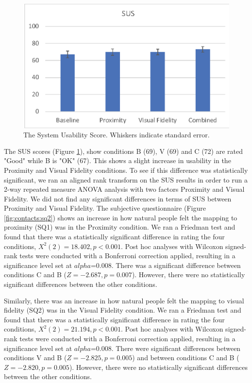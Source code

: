 \begin{figure}[ht]
    \centering
    \includegraphics[width=.8\linewidth]{images/mgia17/analysis-images-02.eps}
    \caption{The System Usability Score. Whiskers indicate standard error.}
    \label{fig:contacts:sus}
\end{figure}
The SUS scores (Figure \ref{fig:contacts:sus}), show conditions B (69), V (69) and C (72) are rated "Good" while B is "OK" (67). This shows a slight increase in usability in the Proximity and Visual Fidelity conditions. To see if this difference was statistically significant, we ran an aligned rank transform on the SUS results in order to run a 2-way repeated measure ANOVA analysis with two factors Proximity and Visual Fidelity. We did not find any significant differences in terms of SUS between Proximity and Visual Fidelity. 
The subjective questionnaire (Figure \ref{fig:contacts:sq2}) shows an increase in how natural people felt the mapping to proximity (SQ1) was in the Proximity condition. We ran a Friedman test and found that there was a statistically significant difference in rating the four conditions, $X^2(2)=18.402,p<0.001$. Post hoc analyses with Wilcoxon signed-rank tests were conducted with a Bonferroni correction applied, resulting in a significance level set at $alpha$=0.008. There was a significant difference between conditions C and B ($Z=-2.687, p=0.007$). However, there were no statistically significant differences between the other conditions.

Similarly, there was an increase in how natural people felt the mapping to visual fidelity (SQ2) was in the Visual Fidelity condition. We ran a Friedman test and found that there was a statistically significant difference in rating the four conditions, $X^2(2)=21.194,p<0.001$. Post hoc analyses with Wilcoxon signed-rank tests were conducted with a Bonferroni correction applied, resulting in a significance level set at $alpha$=0.008. There were significant differences between conditions V and B  ($Z=-2.825, p=0.005$) and between conditions C and B ($Z=-2.820, p=0.005$). However, there were no statistically significant differences between the other conditions.

